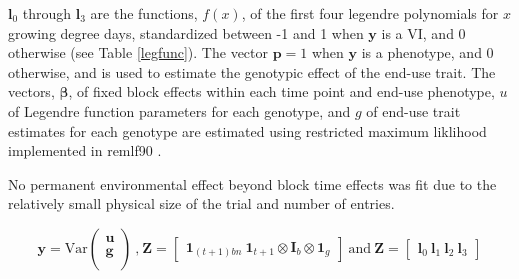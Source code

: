 \documentclass[12pt, letterpaper]{article}
\begin{document}
$\mathbf{l}_0$ through $\mathbf{l}_3$ are the functions, $f(x)$, of the first four legendre polynomials for $x$ growing degree days, standardized between -1 and 1 when $\mathbf{y}$ is a VI, and 0 otherwise (see Table \ref{legfunc}). The vector $\mathbf{p} = 1$ when $\mathbf{y}$ is a phenotype, and 0 otherwise, and is used to estimate the genotypic effect of the end-use trait. The vectors, $\boldsymbol \beta$, of fixed block effects within each time point and end-use phenotype, $u$ of Legendre function parameters for each genotype, and $g$ of end-use trait estimates for each genotype are estimated using restricted maximum liklihood implemented in remlf90 \parencite{misztal2002}.



No permanent environmental effect beyond block time effects was fit due to the relatively small physical size of the trial and number of entries. 


\begin{equation}
 \mathbf{y} = \text{Var}\begin{pmatrix}
    \mathbf{u} \\
    \mathbf{g} \\
  \end{pmatrix} \ \text{,} \  \mathbf{Z} = \begin{bmatrix}
    \mathbf{1}_{(t+1)bn} \ \mathbf{1}_{t+1} \otimes \mathbf{I}_{b} \otimes \mathbf{1}_{g}
  \end{bmatrix} \ \text{and} \  \mathbf{Z} = \begin{bmatrix}
    \mathbf{l}_0 \ \mathbf{l}_1 \ \mathbf{l}_2 \ \mathbf{l}_3
  \end{bmatrix}
\end{equation}




\subsection{}

\end{document}
